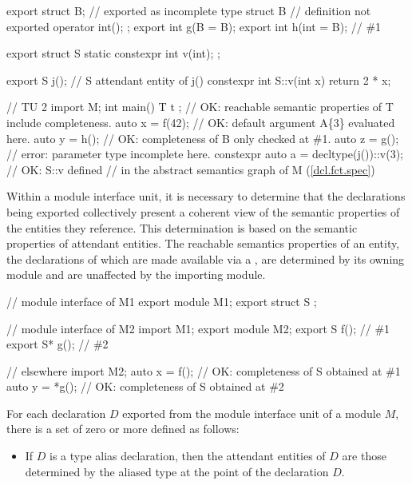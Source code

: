 \begin{std.txt}
\begin{example}
\begin{codeblock}
      export struct B;      // exported as incomplete type
      struct B {            // definition not exported
        operator int();
      };
      export int g(B = B{});
      export int h(int = B{}); // \#1

      export struct S {
        static constexpr int v(int);
      };

      export S j();       // S attendant entity of j()
      constexpr int S::v(int x) { return 2 * x; }


      // TU 2
      import M;
      int main() {
        T t { };             // OK: reachable semantic properties of T include completeness. 
        auto x = f(42);      // OK: default argument A\{3\} evaluated here.
        auto y = h();        // OK: completeness of B only checked at \#1.
        auto z = g();        // error: parameter type incomplete here.
        constexpr auto a = decltype(j())::v(3); // OK: S::v defined 
                            // in the abstract semantics graph of M (\ref{dcl.fct.spec})
      }
    \end{codeblock}
  \end{example}
  \exitnote

  \alinea
  Within a module interface unit, it is necessary to determine that the
  declarations being exported collectively present a coherent view of 
  the semantic properties of the entities they reference.  This determination
  is based on the semantic properties of attendant entities.
  \enternote
  The reachable semantics properties of an entity, the declarations of which
  are made available via a , are
  determined by its owning module and are unaffected by the importing module.
  \begin{example}
    \begin{codeblock}
      // module interface of M1
      export module M1;
      export struct S { };

      // module interface of M2
      import M1;
      export module M2;
      export S f();       // \#1
      export S* g();      // \#2

      // elsewhere
      import M2;
      auto x = f();       // OK: completeness of S obtained at \#1
      auto y = *g();      // OK: completeness of S obtained at \#2
    \end{codeblock}
  \end{example}
  \exitnote
  
  For each declaration $D$ exported from the module interface unit of a module $M$,
   there is a set of zero or more
   defined as follows:
  \begin{itemize}
    \item If $D$ is a type alias declaration, then the attendant entities
    of $D$ are those determined by the aliased type at the point of the 
    declaration $D$.


\end{itemize}
\end{std.txt}
